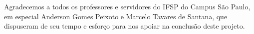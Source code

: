 \begin{agradecimentos}
Agradecemos a todos os professores e servidores do IFSP do Campus São Paulo, em especial Anderson Gomes Peixoto e Marcelo Tavares de Santana, que dispuseram de seu tempo e esforço para nos apoiar na conclusão deste projeto.
\end{agradecimentos}